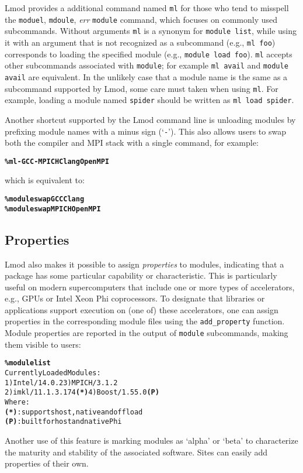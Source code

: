 Lmod provides a additional command named \texttt{\small ml} for those who tend to
misspell the \texttt{\small moduel}, \texttt{\small mdoule}, \emph{err}
\texttt{\small module} command, which focuses on
commonly used subcommands. Without arguments \texttt{\small ml} is a synonym for
\texttt{\small module list}, while using it with an argument that is not
recognized as a subcommand (e.g., \texttt{\small ml foo}) corresponds to loading
the specified module (e.g., \texttt{\small module load foo}).
\texttt{\small ml} accepts other subcommands associated with \texttt{\small module};
for example \texttt{\small ml avail} and \texttt{\small module avail} are equivalent.
In the unlikely case that a module name is the same as a subcommand supported by Lmod, 
some care must taken when using \texttt{\small ml}. For example, loading a module
named \texttt{\small spider} should be written as \texttt{\small ml load spider}.

Another shortcut supported by the Lmod command line is unloading modules by
prefixing module names with a minus sign (`\texttt{\small-}'). This also allows users to swap both the compiler and MPI stack with a single command, for example:
{\small
  \begin{alltt}
      \textbf{\% ml -GCC -MPICH Clang OpenMPI}\
  \end{alltt}
}
\noindent
which is equivalent to:{\small
  \begin{alltt}
      \textbf{\% module swap GCC Clang}
      \textbf{\% module swap MPICH OpenMPI}\
  \end{alltt}
}

\subsection{Properties}

Lmod also makes it possible to assign \emph{properties} to modules,
indicating that a package has some particular capability or
characteristic. This is particularly useful on modern supercomputers that include
one or more types of accelerators, e.g., GPUs or Intel Xeon Phi coprocessors.
To designate that libraries or applications support execution on (one of) these
accelerators, one can assign properties in the corresponding module files
using the \texttt{\small add\_property} function. 
Module properties are reported in the output of \texttt{\small module} subcommands,
making them visible to users:
{\small
\begin{alltt}
  \textbf{\% module list}
  Currently Loaded Modules:
    1) Intel/14.0.2        3) MPICH/3.1.2
    2) imkl/11.1.3.174 \textbf{(*)} 4) Boost/1.55.0 \textbf{(P)}
  Where:
   \textbf{(*)}:  supports host, native and offload
   \textbf{(P)}:  built for host and native Phi
\end{alltt}
}
\noindent Another use of this feature is marking modules as `alpha'
or `beta' to characterize the maturity and stability of the 
associated software. Sites can easily add properties of their own.

